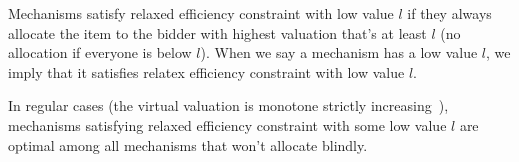 \begin{definition}

Mechanisms satisfy relaxed efficiency constraint with low value $l$
if they always allocate the item to the bidder with highest valuation that's
at least $l$ (no allocation if everyone is below $l$).
%
%
%
%
%
When we say a mechanism has a low value $l$, we imply that it
satisfies relatex efficiency constraint with low value $l$.

\end{definition}


\begin{theorem}
In regular cases (the virtual valuation is monotone strictly increasing~\cite{}),
mechanisms satisfying relaxed efficiency constraint with some low value $l$ are
optimal among all mechanisms that won't allocate blindly.

\end{theorem}

